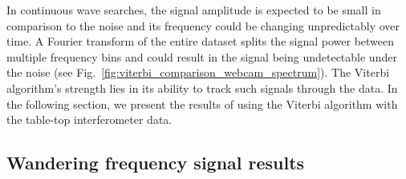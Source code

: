 \documentclass[paper-main.tex]{subfiles}
\begin{document}
In continuous wave searches, the signal amplitude is expected to be small in comparison to the noise and its frequency could be changing unpredictably over time.
A Fourier transform of the entire dataset splits the signal power between multiple frequency bins and could result in the signal being undetectable under the noise (see Fig.~\ref{fig:viterbi_comparison_webcam_spectrum}). 
The Viterbi algorithm's strength lies in its ability to track such signals through the data.
In the following section, we present the results of using the Viterbi algorithm with the table-top interferometer data. 








\subsection{Wandering frequency signal results}
\label{sec:wanderingResults}
\end{document}
